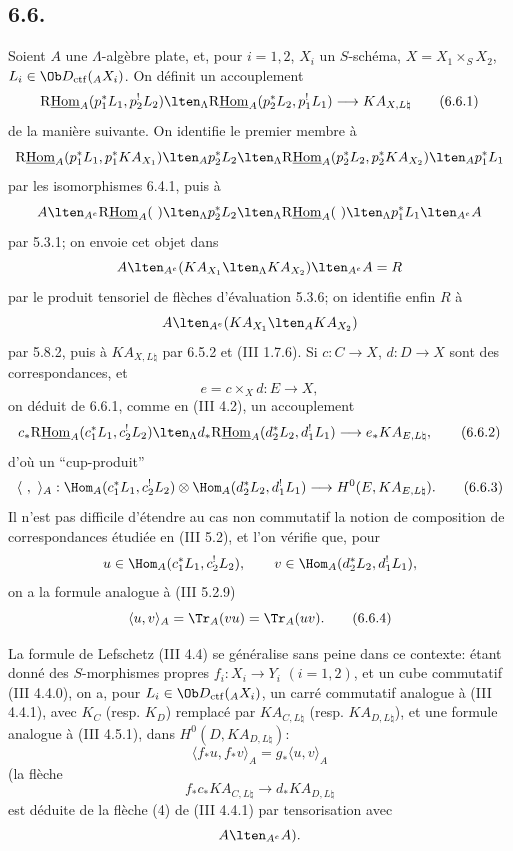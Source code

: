 \subsection*{6.6.}
Soient $A$ une $\Lambda$-algèbre plate, et, pour $i=1,2$, $X_i$ un $S$-schéma, $X=X_1\times_SX_2$, $L_i\in\Ob D_{\mathrm{ctf}}({}_AX_i)$. On définit un accouplement
\begin{equation}
\mathrm{R}\underline{\mathrm{Hom}}_A(p_1^*L_1,p_2^!L_2)
\lten_{\Lambda}
\mathrm{R}\underline{\mathrm{Hom}}_A(p_2^*L_2,p_1^!L_1)
\longrightarrow
KA_{X,L\natural}
\tag{6.6.1}
\end{equation}
de la manière suivante. On identifie le premier
membre à
\[
\mathrm{R}\underline{\mathrm{Hom}}_A(p_1^*L_1,p_1^*KA_{X_1})
\lten_A p_2^*L_2
\lten_{\Lambda}
\mathrm{R}\underline{\mathrm{Hom}}_A(p_2^*L_2,p_2^*KA_{X_2})
\lten_A p_1^*L_1
\]
par les isomorphismes 6.4.1, puis à
\[
A\lten_{A^e}\mathrm{R}\underline{\mathrm{Hom}}_A(\ )\lten_{\Lambda}p_2^*L_2
 \lten_{\Lambda}\mathrm{R}\underline{\mathrm{Hom}}_A(\ )\lten_{\Lambda}p_1^*L_1\lten_{A^e}A
\]
par 5.3.1; on envoie cet objet dans
\[
A\lten_{A^e}(KA_{X_1}\lten_{\Lambda}KA_{X_2})\lten_{A^e}A=R
\]
par le produit tensoriel de flèches d'évaluation 5.3.6; on identifie enfin $R$ à
\[
A\lten_{A^e}(KA_{X_1}\lten_A KA_{X_2})
\]
par 5.8.2, puis à $KA_{X,L\natural}$ par 6.5.2 et (III 1.7.6). Si $c:C\to X$, $d:D\to X$ sont des correspondances, et
\[
e=c\times_Xd:E\to X,
\]
on déduit de 6.6.1, comme en (III 4.2), un accouplement
\begin{equation}
c_*\mathrm{R}\underline{\mathrm{Hom}}_A(c_1^*L_1,c_2^!L_2)
\lten_{\Lambda}
d_*\mathrm{R}\underline{\mathrm{Hom}}_A(d_2^*L_2,d_1^!L_1)
\longrightarrow
e_*KA_{E,L\natural},
\tag{6.6.2}
\end{equation}
d'où un ``cup-produit''
\begin{equation}
\langle\ ,\ \rangle_A:
\Hom_A(c_1^*L_1,c_2^!L_2)\otimes
\Hom_A(d_2^*L_2,d_1^!L_1)
\longrightarrow
H^0(E,KA_{E,L\natural}).
\tag{6.6.3}
\end{equation}
Il n'est pas difficile d'étendre au cas non commutatif la notion de composition de correspondances étudiée en (III 5.2), et l'on vérifie que, pour
\[
u\in\Hom_A(c_1^*L_1,c_2^!L_2),\qquad
v\in\Hom_A(d_2^*L_2,d_1^!L_1),
\]
on a la formule analogue à (III 5.2.9)
\begin{equation}
\langle u,v\rangle_A=\Tr_A(vu)=\Tr_A(uv).
\tag{6.6.4}
\end{equation}

La formule de Lefschetz (III 4.4) se généralise sans peine dans ce contexte: étant donné des $S$-morphismes propres $f_i:X_i\to Y_i$ $(i=1,2)$, et un cube commutatif (III 4.4.0), on a, pour $L_i\in\Ob D_{\mathrm{ctf}}({}_AX_i)$, un carré commutatif analogue à (III 4.4.1), avec $K_C$ (resp. $K_D$) remplacé par $KA_{C,L\natural}$ (resp. $KA_{D,L\natural}$), et une formule analogue à (III 4.5.1), dans $H^0(D,KA_{D,L\natural})$:
\begin{equation}
\langle f_*u,f_*v\rangle_A=g_*\langle u,v\rangle_A
\tag{6.6.5}
\end{equation}
(la flèche
\[
f_*c_*KA_{C,L\natural}\longrightarrow d_*KA_{D,L\natural}
\]
est déduite de la flèche (4) de (III 4.4.1) par tensorisation avec
\[
A\lten_{A^e}A) .
\]

